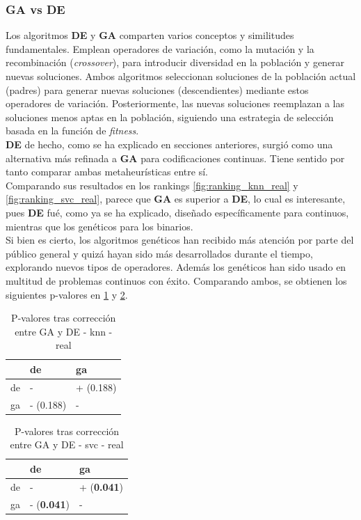 \subsubsection{GA vs DE}
Los algoritmos \textbf{DE} y \textbf{GA} comparten varios conceptos y similitudes fundamentales. Emplean operadores de variación, como la mutación y la recombinación (\textit{crossover}), para introducir diversidad en la población y generar nuevas soluciones. Ambos algoritmos seleccionan soluciones de la población actual (padres) para generar nuevas soluciones (descendientes) mediante estos operadores de variación. Posteriormente, las nuevas soluciones reemplazan a las soluciones menos aptas en la población, siguiendo una estrategia de selección basada en la función de \textit{fitness}.\\[6pt]
\textbf{DE} de hecho, como se ha explicado en secciones anteriores, surgió como una alternativa más refinada a \textbf{GA} para codificaciones continuas. Tiene sentido por tanto comparar ambas metaheurísticas entre sí.\\[6pt]
Comparando sus resultados en los rankings \ref{fig:ranking_knn_real} y \ref{fig:ranking_svc_real}, parece que \textbf{GA} es superior a \textbf{DE}, lo cual es interesante, pues \textbf{DE} fué, como ya se ha explicado, diseñado específicamente para continuos, mientras que los genéticos para los binarios.\\[6pt]
Si bien es cierto, los algoritmos genéticos han recibido más atención por parte del público general y quizá hayan sido más desarrollados durante el tiempo, explorando nuevos tipos de operadores. Además los genéticos han sido usado en multitud de problemas continuos con éxito. Comparando ambos, se obtienen los siguientes p-valores en \ref{tab:pval_corr_ga_de-real_knn} y \ref{tab:pval_corr_ga_de-real_svc}.

\begin{table}[htp]
    \centering
    \begin{tabular}{lll}
        \toprule
        {} & de        & ga        \\
        \midrule
        de & -         & + (0.188) \\
        ga & - (0.188) & -         \\
        \bottomrule
    \end{tabular}
    \caption{P-valores tras corrección entre GA y DE - knn - real}
    \label{tab:pval_corr_ga_de-real_knn}
\end{table}

\begin{table}[htp]
    \centering
    \begin{tabular}{lll}
        \toprule
        {} & de                 & ga                 \\
        \midrule
        de & -                  & + (\textbf{0.041}) \\
        ga & - (\textbf{0.041}) & -                  \\
        \bottomrule
    \end{tabular}
    \caption{P-valores tras corrección entre GA y DE - svc - real}
    \label{tab:pval_corr_ga_de-real_svc}
\end{table}

